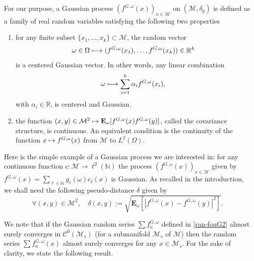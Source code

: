 \documentclass[10pt]{amsart}
\def\mto{\mathchoice{\longmapsto}{\mapsto}{\mapsto}{\mapsto}}
\newenvironment{enumeratei}
{\bgroup\def\theenumi{\roman{enumi}}\def\theenumii{\arabic{enumii}}\begin{enumerate}}
{\end{enumerate}\egroup}
\theoremstyle{theorem}
\theoremstyle{definition}
\newcommand\R{\mathbb{R}}
\newcommand\E{\mathbf{E}}
\newcommand\N{\mathbb{N}}
\newcommand\CC{\mathcal{C}}
\begin{document}
For our purpose, a Gaussian process $(f^{G,\omega}(x))_{x\in \mathcal{M}}$ on $(\mathcal{M},\delta_g)$ is defined as a family of real random variables satisfying the following two properties
\begin{enumeratei}
\item for any finite subset $\{x_1,\dots,x_k\}\subset \mathcal{M}$, the random vector
\begin{equation*}\omega\in\Omega\mto (f^{G,\omega}(x_1),\dots,f^{G,\omega}(x_k))\in \R^k \end{equation*}
is a centered Gaussian vector. In other words, any linear combination
\[
\omega\mto \sum_{i=1}^k\alpha_i f^{G,\omega}(x_i),
\]
with $\alpha_i\in \R$, is centered and Gaussian.
\item the function $(x,y)\in \mathcal{M}^2\mto \E_{\omega}[f^{G,\omega}(x)f^{G,\omega}(y)]$, called the covariance structure, is continuous. An equivalent condition is the continuity of the function $x\mto f^{G,\omega}(x)$ from $\mathcal{M}$ to $L^2(\Omega)$.
\end{enumeratei}

Here is the simple example of a Gaussian process we are interested in: for any
continuous function $c:\mathcal{M}\to \ell^2(\N)$ the process $(f^{G,\omega}(x))_{x\in \mathcal{M}}$ given by $f^{G,\omega}(x)=\sum_{\ell\in \N} g_\ell(\omega) c_\ell(x)$ is Gaussian.
As recalled in the introduction, we shall need the following pseudo-distance $\delta$ given by
\begin{equation*}
\forall (x,y)\in \mathcal{M}^2, \quad \delta(x,y):=\sqrt{\E_{\omega}[|f^{G,\omega}(x)-f^{G,\omega}(y)|^2]}.
\end{equation*}

We note that if the Gaussian random series $\sum f_n^{G,\omega}$ defined in \eqref{ran-fouG2} almost surely converges in $\CC^0(\mathcal{M}_s)$ (for a submanifold $\mathcal{M}_s$ of $\mathcal{M}$) then the random series $\sum f_n^{G,\omega}(x)$ almost surely converges for any $x\in \mathcal{M}_s$.
For the sake of clarity, we state the following result.
\end{document}
